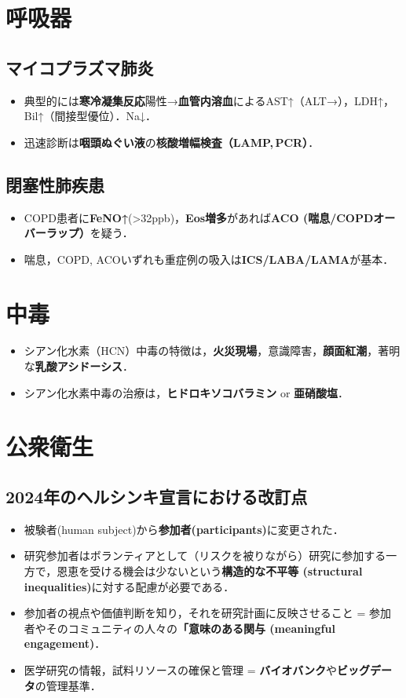 \section{呼吸器}
\subsection{マイコプラズマ肺炎}
\begin{itemize}
\item 典型的には\textbf{寒冷凝集反応}陽性→\textbf{血管内溶血}によるAST↑（ALT→），LDH↑，Bil↑（間接型優位）．Na↓．
\item 迅速診断は\textbf{咽頭ぬぐい液}の\textbf{核酸増幅検査（LAMP,\,PCR）}．
\end{itemize}
\subsection{閉塞性肺疾患}
\begin{itemize}
\item COPD患者に\textbf{FeNO↑}(>32ppb)，\textbf{Eos増多}があれば\textbf{ACO (喘息/COPDオーバーラップ）}を疑う．
\item 喘息，COPD, ACOいずれも重症例の吸入は\textbf{ICS/LABA/LAMA}が基本．

\end{itemize}

\section{中毒}
\begin{itemize}
\item シアン化水素（HCN）中毒の特徴は，\textbf{火災現場}，意識障害，\textbf{顔面紅潮}，著明な\textbf{乳酸アシドーシス}．
\item シアン化水素中毒の治療は，\textbf{ヒドロキソコバラミン} or \textbf{亜硝酸塩}．

\end{itemize}

\section{公衆衛生}
\subsection{2024年のヘルシンキ宣言における改訂点}
\begin{itemize}

\item 被験者(human subject)から\textbf{参加者(participants)}に変更された．
\item 研究参加者はボランティアとして（リスクを被りながら）研究に参加する一方で，恩恵を受ける機会は少ないという\textbf{構造的な不平等 (structural inequalities)}に対する配慮が必要である．
\item 参加者の視点や価値判断を知り，それを研究計画に反映させること = 参加者やそのコミュニティの人々の\textbf{「意味のある関与 (meaningful engagement)}．
\item 医学研究の情報，試料リソースの確保と管理 = \textbf{バイオバンク}や\textbf{ビッグデータ}の管理基準．

\end{itemize}


